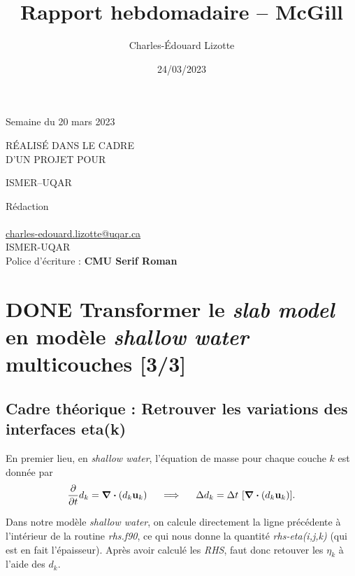 \documentclass[10pt]{article}
\author{Charles-Édouard Lizotte}
\date{24/03/2023}
\title{Rapport hebdomadaire -- McGill}
\makeatletter
\numberwithin{equation}{section}
\newcommand{\mytitlepage}{
\begin{titlepage}
\begin{center}
{\Huge \thesubtitle \par}
\vspace{2cm}
{\Huge \MakeUppercase{\thetitle} \par}
\vspace{2cm}
RÉALISÉ DANS LE CADRE\\ D'UN PROJET POUR \par
\vspace{2cm}
{\Huge ISMER--UQAR \par}
\vspace{2cm}
{\thedate}
\end{center}
\vfill
Rédaction \\
{\theauthor}\\
\url{charles-edouard.lizotte@uqar.ca}\\
ISMER-UQAR\\
Police d'écriture : \textbf{CMU Serif Roman}
\end{titlepage}
}
\newcommand{\thesubtitle}{Semaine du 20 mars 2023}
\makeatother
\begin{document}
\mytitlepage
\tableofcontents\newpage
\section{{\bfseries\sffamily DONE} Transformer le \emph{slab model} en modèle \emph{shallow water} multicouches [3/3]}
\label{sec:orgc48437c}
\subsection{\textbf{Cadre théorique} : Retrouver les variations des interfaces eta(k)}
\label{sec:org046be6b}
En premier lieu, en \emph{shallow water}, l'équation de masse pour chaque couche \(k\) est donnée par
\begin{equation}
\pdv{}{t} d_k = \divergence (d_k\vb{u}_k)
\hspace{0.5cm}\Longrightarrow\hspace{0.5cm}
\Delta d_k = \Delta t \ \qty[ \divergence (d_k \vb{u}_k)].
\end{equation}

Dans notre modèle \emph{shallow water}, on calcule directement la ligne précédente à l'intérieur de la routine \emph{rhs.f90}, ce qui nous donne la quantité \emph{rhs-eta(i,j,k)} (qui est en fait l'épaisseur).
Après avoir calculé les \emph{RHS}, faut donc retouver les \(\eta_k\) à l'aide des \(d_k\).
\end{document}
